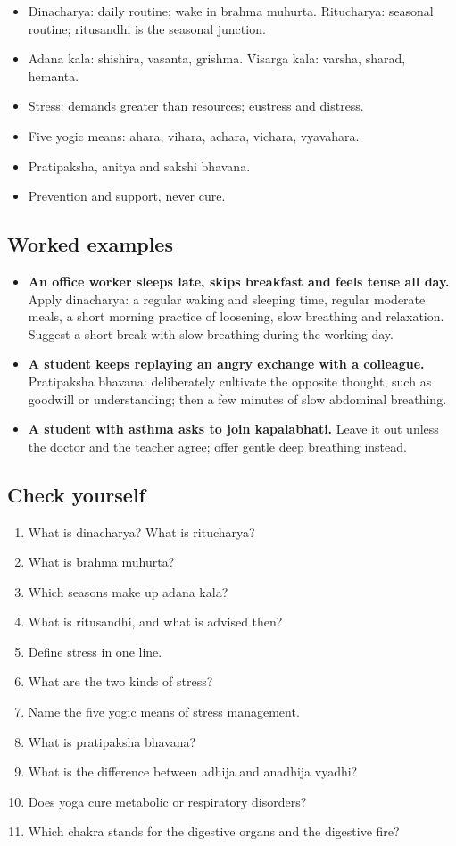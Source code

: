 \begin{recall}
\begin{itemize}
\item Dinacharya: daily routine; wake in brahma muhurta. Ritucharya: seasonal routine; ritusandhi is the seasonal junction.
\item Adana kala: shishira, vasanta, grishma. Visarga kala: varsha, sharad, hemanta.
\item Stress: demands greater than resources; eustress and distress.
\item Five yogic means: ahara, vihara, achara, vichara, vyavahara.
\item Pratipaksha, anitya and sakshi bhavana.
\item Prevention and support, never cure.
\end{itemize}
\end{recall}

\subsection*{Worked examples}
\begin{itemize}
\item \textbf{An office worker sleeps late, skips breakfast and feels tense all day.} Apply dinacharya: a regular waking and sleeping time, regular moderate meals, a short morning practice of loosening, slow breathing and relaxation. Suggest a short break with slow breathing during the working day.
\item \textbf{A student keeps replaying an angry exchange with a colleague.} Pratipaksha bhavana: deliberately cultivate the opposite thought, such as goodwill or understanding; then a few minutes of slow abdominal breathing.
\item \textbf{A student with asthma asks to join kapalabhati.} Leave it out unless the doctor and the teacher agree; offer gentle deep breathing instead.
\end{itemize}

\subsection*{Check yourself}
\begin{enumerate}
\item What is dinacharya? What is ritucharya?
\item What is brahma muhurta?
\item Which seasons make up adana kala?
\item What is ritusandhi, and what is advised then?
\item Define stress in one line.
\item What are the two kinds of stress?
\item Name the five yogic means of stress management.
\item What is pratipaksha bhavana?
\item What is the difference between adhija and anadhija vyadhi?
\item Does yoga cure metabolic or respiratory disorders?
\item Which chakra stands for the digestive organs and the digestive fire?
\end{enumerate}


